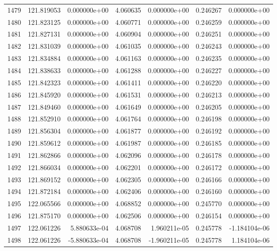 \begin{tabular}{rrrrrrr}
1479 & 121.819053 &  0.000000e+00 &  4.060635 &  0.000000e+00 &    0.246267 &  0.000000e+00 \\
1480 & 121.823125 &  0.000000e+00 &  4.060771 &  0.000000e+00 &    0.246259 &  0.000000e+00 \\
1481 & 121.827131 &  0.000000e+00 &  4.060904 &  0.000000e+00 &    0.246251 &  0.000000e+00 \\
1482 & 121.831039 &  0.000000e+00 &  4.061035 &  0.000000e+00 &    0.246243 &  0.000000e+00 \\
1483 & 121.834884 &  0.000000e+00 &  4.061163 &  0.000000e+00 &    0.246235 &  0.000000e+00 \\
1484 & 121.838633 &  0.000000e+00 &  4.061288 &  0.000000e+00 &    0.246227 &  0.000000e+00 \\
1485 & 121.842323 &  0.000000e+00 &  4.061411 &  0.000000e+00 &    0.246220 &  0.000000e+00 \\
1486 & 121.845920 &  0.000000e+00 &  4.061531 &  0.000000e+00 &    0.246213 &  0.000000e+00 \\
1487 & 121.849460 &  0.000000e+00 &  4.061649 &  0.000000e+00 &    0.246205 &  0.000000e+00 \\
1488 & 121.852910 &  0.000000e+00 &  4.061764 &  0.000000e+00 &    0.246198 &  0.000000e+00 \\
1489 & 121.856304 &  0.000000e+00 &  4.061877 &  0.000000e+00 &    0.246192 &  0.000000e+00 \\
1490 & 121.859612 &  0.000000e+00 &  4.061987 &  0.000000e+00 &    0.246185 &  0.000000e+00 \\
1491 & 121.862866 &  0.000000e+00 &  4.062096 &  0.000000e+00 &    0.246178 &  0.000000e+00 \\
1492 & 121.866034 &  0.000000e+00 &  4.062201 &  0.000000e+00 &    0.246172 &  0.000000e+00 \\
1493 & 121.869152 &  0.000000e+00 &  4.062305 &  0.000000e+00 &    0.246166 &  0.000000e+00 \\
1494 & 121.872184 &  0.000000e+00 &  4.062406 &  0.000000e+00 &    0.246160 &  0.000000e+00 \\
1495 & 122.065566 &  0.000000e+00 &  4.068852 &  0.000000e+00 &    0.245770 &  0.000000e+00 \\
1496 & 121.875170 &  0.000000e+00 &  4.062506 &  0.000000e+00 &    0.246154 &  0.000000e+00 \\
1497 & 122.061226 &  5.880633e-04 &  4.068708 &  1.960211e-05 &    0.245778 & -1.184104e-06 \\
1498 & 122.061226 & -5.880633e-04 &  4.068708 & -1.960211e-05 &    0.245778 &  1.184104e-06 \\

\end{tabular}
